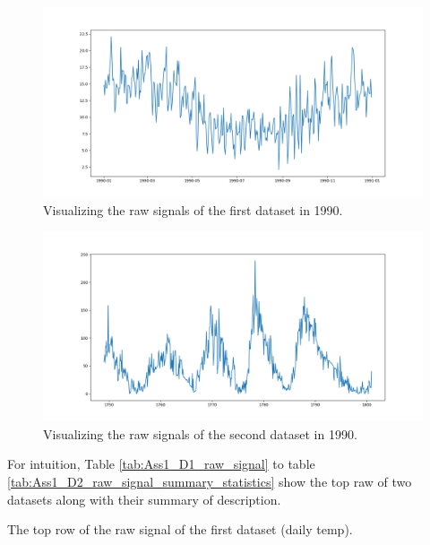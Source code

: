 \documentclass[12pt]{article}
\begin{document}
\begin{enumerate}
\begin{figure}[H]
    \centering
    \begin{minipage}[b]{1\textwidth}
        \includegraphics[width=\textwidth]{figures/Ass1/Ass1_D1_raw_signal_1990.png}
    \end{minipage}
    \caption{Visualizing the raw signals of the first dataset in 1990.}
    \label{fig:Ass1_D1_raw_signal_1990}
\end{figure}

\begin{figure}[H]
    \centering
    \begin{minipage}[b]{1\textwidth}
        \includegraphics[width=\textwidth]{figures/Ass1/Ass1_D2_raw_signal_1990.png}
    \end{minipage}
    \caption{Visualizing the raw signals of the second dataset in 1990.}
    \label{fig:Ass1_D2_raw_signal_1990}
\end{figure}

For intuition, Table \ref{tab:Ass1_D1_raw_signal} to table \ref{tab:Ass1_D2_raw_signal_summary_statistics} show the top raw of two datasets along with their summary of description.


\begin{table}[H]
 \centering
\caption{The top row of the raw signal of the first dataset (daily temp).
{\label{tab:Ass1_D1_raw_signal}}}

\end{table}


\end{enumerate}
\end{document}
